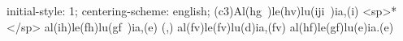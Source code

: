 initial-style: 1;
centering-scheme: english;
(c3)Al(hg~)le(hv)lu(iji~)ia,(i) <sp>*</sp> al(ih)le(fh)lu(gf~)ia,(e) (,) al(fv)le(fv)lu(d)ia,(fv) al(hf)le(gf)lu(e)ia.(e)
